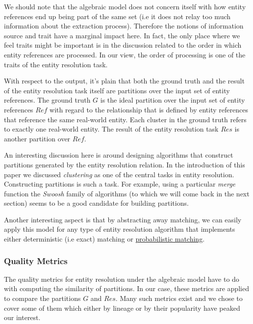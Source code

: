 \documentclass[11pt]{article}
\begin{document}
    We should note that the algebraic model does not concern itself with how
    entity references end up being part of the same set (i.e it does not relay
    too much information about the extraction process).
    Therefore the notions of information source and trait have a marginal impact
    here.
    In fact, the only place where we feel traits might be important is in the
    discussion related to the order in which entity references are processed.
    In our view, the order of processing is one of the traits of the entity
    resolution task.

    With respect to the output, it's plain that both the ground truth and the
    result of the entity resolution task itself are partitions over the input
    set of entity references.
    The ground truth $G$ is the ideal partition over the input set of entity
    references $Ref$ with regard to the relationship that is defined by entity
    references that reference the same real-world entity.
    Each cluster in the ground truth refers to exactly one real-world entity.
    The result of the entity resolution task $Res$ is another partition over
    $Ref$.

    An interesting discussion here is around designing algorithms that construct
    partitions generated by the entity resolution relation.
    In the introduction of this paper we discussed \textit{clustering} as one of
    the central tasks in entity resolution.
    Constructing partitions is such a task.
    For example, using a particular \textit{merge} function the
    \textit{Swoosh}\cite{Ben2009Swoosh} family of algorithms (to which we will
    come back in the next section) seems to be a good candidate for building
    partitions.
    
    Another interesting aspect is that by abstracting away matching, we can
    easily apply this model for any type of entity resolution algorithm that
    implements either deterministic (i.e exact) matching or
    \hyperref[subsec:fsm]{probabilistic matching}.

    \subsubsection[algeval]{Quality Metrics}\label{subsubsec:algeval}

    The quality metrics for entity resolution under the algebraic model have to
    do with computing the similarity of partitions.
    In our case, these metrics are applied to compare the partitions $G$ and
    $Res$.
    Many such metrics exist\cite{hitesh2012} and we chose to cover some of them
    which either by lineage or by their popularity have peaked our interest.
\end{document}
